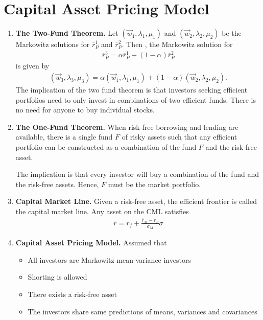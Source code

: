 \documentclass[12pt,twoside]{article}
\begin{document}
\section{Capital Asset Pricing Model}
\begin{enumerate}
	\item \textbf{The Two-Fund Theorem.} Let $(\vec{w}_1, \lambda_1, \mu_1)$ and $(\vec{w}_2, \lambda_2, \mu_2)$ be the Markowitz solutions for $\overline{r}_P^1$ and $\overline{r}_P^2$. Then , the Markowitz solution for 
		\begin{align*}
			\overline{r}_P^3 = \alpha \overline{r}_P^1 + (1-\alpha)\overline{r}_P^2
		\end{align*}
is given by
		\begin{align*}
			(\vec{w}_3, \lambda_3, \mu_3) = \alpha(\vec{w}_1, \lambda_1, \mu_1) + (1-\alpha)(\vec{w}_2, \lambda_2, \mu_2).
		\end{align*}
The implication of the two fund theorem is that investors seeking efficient portfolios need to only invest in combinations of two efficient funds. There is no need for anyone to buy individual stocks.

	\item \textbf{The One-Fund Theorem.} When risk-free borrowing and lending are available, there is a single fund $F$ of risky assets such that any efficient portfolio can be constructed as a combination of the fund $F$ and the risk free asset. 
	
	The implication is that every investor will buy a combination of the fund and the risk-free assets. Hence, $F$ must be the market portfolio.
	
	 \item \textbf{Capital Market Line.} Given a risk-free asset, the efficient frontier is called the capital market line. Any asset on the CML satisfies
	 	\begin{align*}
	 		\overline{r} = r_f +\frac{\overline{r}_M - r_F}{\sigma_M}\sigma
	 	\end{align*}
	 	
	 \item \textbf{Capital Asset Pricing Model.} Assumed that 
	 \begin{itemize}
	 	\item All investors are Markowitz mean-variance investors
	 	\item Shorting is allowed
	 	\item There exists a risk-free asset
	 	\item The investors share same predictions of means, variances and covariances
	 \end{itemize}
	 

\end{enumerate}
\end{document}
